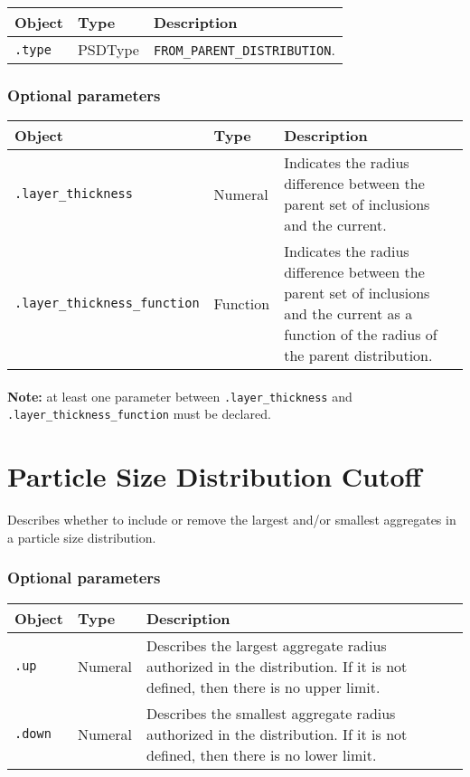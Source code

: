 \documentclass[10pt]{article}
\begin{document}
\begin{tabularx}{\textwidth}{llX}
\hline 
Object & Type & Description \\ 
\hline 
\verb+.type+ & PSDType & \verb+FROM_PARENT_DISTRIBUTION+. \\ 
\hline 
\end{tabularx}

\subsubsection*{Optional parameters}

\begin{tabularx}{\textwidth}{llX}
\hline 
Object & Type & Description \\ 
\hline 
\verb+.layer_thickness+ & Numeral & Indicates the radius difference between the parent set of inclusions and the current. \\ 
\verb+.layer_thickness_function+ & Function & Indicates the radius difference between the parent set of inclusions and the current as a function of the radius of the parent distribution. \\ 
\hline 
\end{tabularx}

\paragraph{} \textbf{Note:} at least one parameter between \verb+.layer_thickness+  and \verb+.layer_thickness_function+ must be declared.

\section{Particle Size Distribution Cutoff}

Describes whether to include or remove the largest and/or smallest aggregates in a particle size distribution.

\subsubsection*{Optional parameters}

\begin{tabularx}{\textwidth}{llX}
\hline 
Object & Type & Description \\ 
\hline 
\verb+.up+ & Numeral & Describes the largest aggregate radius authorized in the distribution. If it is not defined, then there is no upper limit.\\
\verb+.down+ & Numeral & Describes the smallest aggregate radius authorized in the distribution. If it is not defined, then there is no lower limit.\\
\hline 
\end{tabularx}
\end{document}
